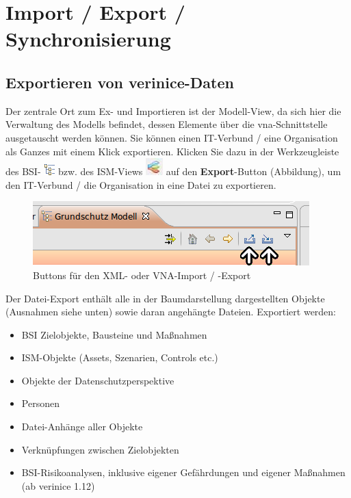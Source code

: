 \documentclass[a4paper,10pt]{book}
\begin{document}
\chapter{Import / Export / Synchronisierung}

\section{Exportieren von verinice-Daten} \label{Exportieren von verinice-Daten}
Der zentrale Ort zum Ex- und Importieren ist der Modell-View, da sich hier die Verwaltung des Modells befindet, dessen Elemente über die vna-Schnittstelle ausgetauscht werden können.
Sie können einen IT-Verbund / eine Organisation als Ganzes mit einem Klick exportieren. Klicken Sie dazu in der Werkzeugleiste des BSI-
\includegraphics[height=2ex]{Icon/GS_Modell.png} bzw. des ISM-Views \includegraphics[height=2ex]{Icon/Informationssicherheitsmodell.png} auf den
\textbf{Export}-Button (Abbildung), um den IT-Verbund / die Organisation in eine Datei zu exportieren.
\newline
\begin{figure}[htb!]
  \centering
  \includegraphics[scale=.7]{Screenshot/Import-export_buttons.png}
  \caption{\label{Buttons fuer den XML- oder VNA-Import / -Export} Buttons für den XML- oder VNA-Import / -Export}
\end{figure}
\newline
Der Datei-Export enthält alle in der Baumdarstellung dargestellten Objekte (Ausnahmen siehe unten) sowie daran angehängte Dateien.
\newline
Exportiert werden:
\begin{itemize}
 \item BSI Zielobjekte, Bausteine und Maßnahmen
 \item ISM-Objekte (Assets, Szenarien, Controls etc.)
 \item Objekte der Datenschutzperspektive
 \item Personen
 \item Datei-Anhänge aller Objekte
 \item Verknüpfungen zwischen Zielobjekten
 \item BSI-Risikoanalysen, inklusive eigener Gefährdungen und eigener
   Maßnahmen (ab verinice 1.12)
\end{itemize}
\end{document}
